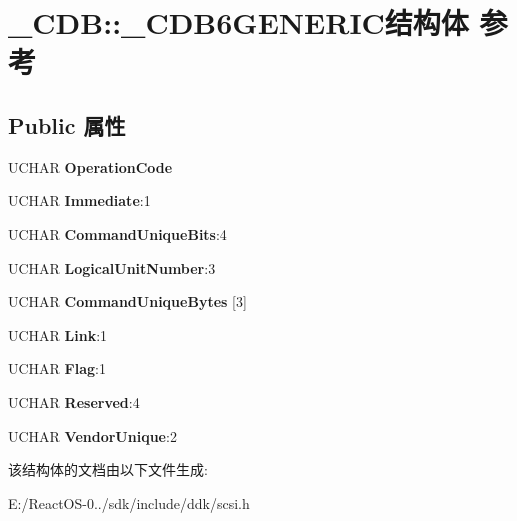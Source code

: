 \hypertarget{struct___c_d_b_1_1___c_d_b6_g_e_n_e_r_i_c}{}\section{\+\_\+\+C\+DB\+:\+:\+\_\+\+C\+D\+B6\+G\+E\+N\+E\+R\+I\+C结构体 参考}
\label{struct___c_d_b_1_1___c_d_b6_g_e_n_e_r_i_c}
\subsection*{Public 属性}
\begin{DoxyCompactItemize}
\item 
\mbox{\label{struct___c_d_b_1_1___c_d_b6_g_e_n_e_r_i_c_a09947fa4212dc0bdf47313d56520907f}} 
U\+C\+H\+AR {\bfseries Operation\+Code}
\item 
\mbox{\label{struct___c_d_b_1_1___c_d_b6_g_e_n_e_r_i_c_a977fbb343051cebcc7940c86d57bc018}} 
U\+C\+H\+AR {\bfseries Immediate}\+:1
\item 
\mbox{\label{struct___c_d_b_1_1___c_d_b6_g_e_n_e_r_i_c_aa6a78fb4eb5b67b03f6c61c88a67826b}} 
U\+C\+H\+AR {\bfseries Command\+Unique\+Bits}\+:4
\item 
\mbox{\label{struct___c_d_b_1_1___c_d_b6_g_e_n_e_r_i_c_a134d6afc6787c457aee595c35288ca8c}} 
U\+C\+H\+AR {\bfseries Logical\+Unit\+Number}\+:3
\item 
\mbox{\label{struct___c_d_b_1_1___c_d_b6_g_e_n_e_r_i_c_accdec4058b976204d3336b7a01373b87}} 
U\+C\+H\+AR {\bfseries Command\+Unique\+Bytes} \mbox{[}3\mbox{]}
\item 
\mbox{\label{struct___c_d_b_1_1___c_d_b6_g_e_n_e_r_i_c_a4ef70a06fed2c981eb43c47f704807d5}} 
U\+C\+H\+AR {\bfseries Link}\+:1
\item 
\mbox{\label{struct___c_d_b_1_1___c_d_b6_g_e_n_e_r_i_c_ac3793ce089e6b180dca7bfac9df54f52}} 
U\+C\+H\+AR {\bfseries Flag}\+:1
\item 
\mbox{\label{struct___c_d_b_1_1___c_d_b6_g_e_n_e_r_i_c_a94d562ccabc0eff8348b06038d6cf419}} 
U\+C\+H\+AR {\bfseries Reserved}\+:4
\item 
\mbox{\label{struct___c_d_b_1_1___c_d_b6_g_e_n_e_r_i_c_abe2b4d5c8b4ef178ac166e157409baf0}} 
U\+C\+H\+AR {\bfseries Vendor\+Unique}\+:2
\end{DoxyCompactItemize}


该结构体的文档由以下文件生成\+:\begin{DoxyCompactItemize}
\item 
E\+:/\+React\+O\+S-\/0../sdk/include/ddk/scsi.\+h\end{DoxyCompactItemize}
